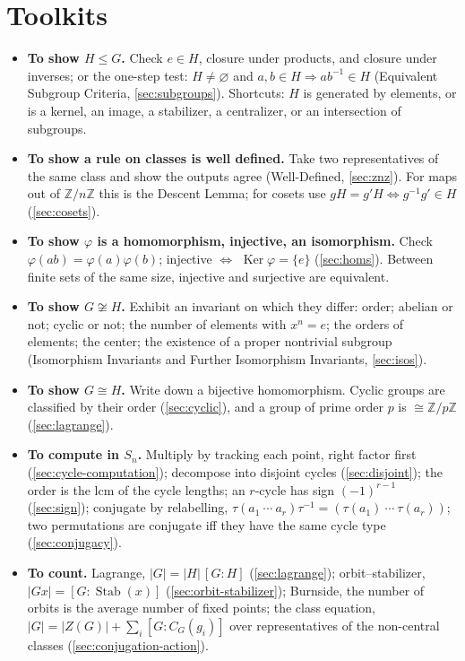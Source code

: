 \documentclass[11pt]{report}
\begin{document}
\section*{Toolkits}
{}\label{sec:toolkits}

\begin{itemize}
    \item \textbf{To show $H \leq G$.} Check $e \in H$, closure under products, and closure under inverses; or the one-step test: $H \neq \varnothing$ and $a, b \in H \Rightarrow ab^{-1} \in H$ (Equivalent Subgroup Criteria, \ref{sec:subgroups}). Shortcuts: $H$ is generated by elements, or is a kernel, an image, a stabilizer, a centralizer, or an intersection of subgroups.
    \item \textbf{To show a rule on classes is well defined.} Take two representatives of the same class and show the outputs agree (Well-Defined, \ref{sec:znz}). For maps out of $\mathbb{Z}/n\mathbb{Z}$ this is the Descent Lemma; for cosets use $gH = g'H \iff g^{-1}g' \in H$ (\ref{sec:cosets}).
    \item \textbf{To show $\varphi$ is a homomorphism, injective, an isomorphism.} Check $\varphi(ab) = \varphi(a)\varphi(b)$; injective $\iff$ $\operatorname{Ker}\varphi = \{e\}$ (\ref{sec:homs}). Between finite sets of the same size, injective and surjective are equivalent.
    \item \textbf{To show $G \not\cong H$.} Exhibit an invariant on which they differ: order; abelian or not; cyclic or not; the number of elements with $x^n = e$; the orders of elements; the center; the existence of a proper nontrivial subgroup (Isomorphism Invariants and Further Isomorphism Invariants, \ref{sec:isos}).
    \item \textbf{To show $G \cong H$.} Write down a bijective homomorphism. Cyclic groups are classified by their order (\ref{sec:cyclic}), and a group of prime order $p$ is $\cong \mathbb{Z}/p\mathbb{Z}$ (\ref{sec:lagrange}).
    \item \textbf{To compute in $S_n$.} Multiply by tracking each point, right factor first (\ref{sec:cycle-computation}); decompose into disjoint cycles (\ref{sec:disjoint}); the order is the lcm of the cycle lengths; an $r$-cycle has sign $(-1)^{r-1}$ (\ref{sec:sign}); conjugate by relabelling, $\tau(a_1\ \cdots\ a_r)\tau^{-1} = (\tau(a_1)\ \cdots\ \tau(a_r))$; two permutations are conjugate iff they have the same cycle type (\ref{sec:conjugacy}).
    \item \textbf{To count.} Lagrange, $|G| = |H|\,[G:H]$ (\ref{sec:lagrange}); orbit--stabilizer, $|Gx| = [G : \operatorname{Stab}(x)]$ (\ref{sec:orbit-stabilizer}); Burnside, the number of orbits is the average number of fixed points; the class equation, $|G| = |Z(G)| + \sum_i [G : C_G(g_i)]$ over representatives of the non-central classes (\ref{sec:conjugation-action}).

\end{itemize}
\end{document}
